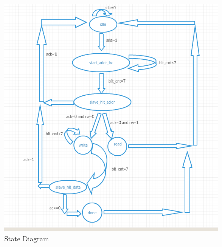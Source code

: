 \documentclass[12pt,twocolumn]{IEEEtran}
\begin{document}
    \begin{figure}[h]
    \includegraphics{I2C_State_diagram.png}
    \caption{State Diagram}
    \end{figure}
\end{document}

